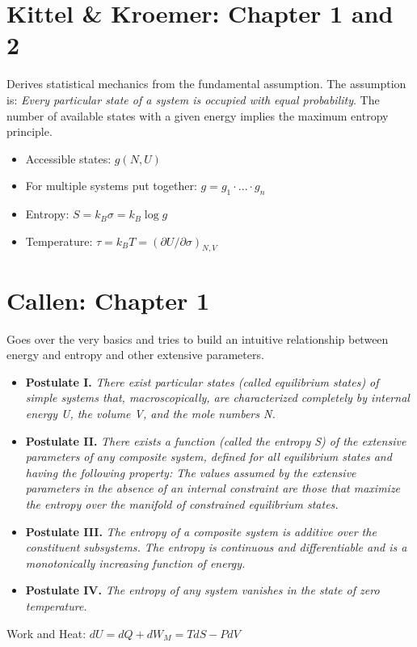 
\section{Kittel \& Kroemer: Chapter 1 and 2}
Derives statistical mechanics from the fundamental assumption. The assumption is: \emph{Every particular state of a system is occupied with equal probability}. The number of available states with a given energy implies the maximum entropy principle. 
\begin{itemize}
    \item Accessible states: $g(N,U)$
    \item For multiple systems put together: $g = g_1 \cdot ... \cdot g_n$
    \item Entropy: $S=k_B \sigma = k_B \log{g}$
    \item Temperature: $\tau = k_B T = (\partial U/ \partial \sigma)_{N,V}$
\end{itemize}


\section{Callen: Chapter 1}
Goes over the very basics and tries to build an intuitive relationship between energy and entropy and other extensive parameters.
\begin{itemize}
    \item \textbf{Postulate I.} \emph{There exist particular states (called equilibrium states) of simple systems that, macroscopically, are characterized completely by internal energy U, the volume V, and the mole numbers N.}
    \item \textbf{Postulate II.} \emph{There exists a function (called the entropy S) of the extensive parameters of any composite system, defined for all equilibrium states and having the following property: The values assumed by the extensive parameters in the absence of an internal constraint are those that maximize the entropy over the manifold of constrained equilibrium states.}
    \item \textbf{Postulate III.} \emph{The entropy of a composite system is additive over the constituent subsystems. The entropy is continuous and differentiable and is a monotonically increasing function of energy.}
    \item \textbf{Postulate IV.} \emph{The entropy of any system vanishes in the state of zero temperature.}
\end{itemize}

Work and Heat: $dU = dQ + dW_M = TdS - PdV$

